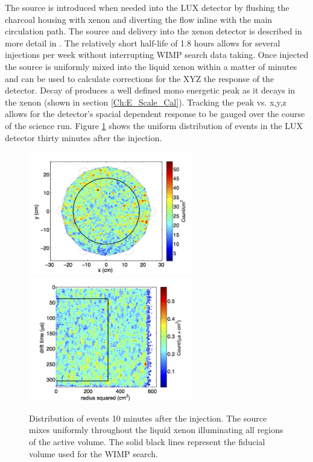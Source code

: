 The \KrCal source is introduced when needed into the LUX detector by flushing the charcoal housing with xenon and diverting the flow inline with the main circulation path. The \KrCal source and delivery into the xenon detector is described in more detail in \cite{Kastens}. The relatively short half-life of 1.8 hours allows for several injections per week without interrupting WIMP search data taking. Once injected the source is uniformly mixed into the liquid xenon within a matter of minutes and can be used to calculate corrections for the XYZ the response of the detector. Decay of \KrCal produces a well defined mono energetic peak as it decays in the xenon (shown in section \ref{Ch:E_Scale_Cal}). Tracking the peak vs. x,y,z allows for the detector's spacial dependent response to be gauged over the course of the science run. Figure \ref{fig:Kr_Dist} shows the uniform distribution of \KrCal events in the LUX detector thirty minutes after the injection. 

\begin{figure}[h!]\centering
\includegraphics[width=72mm]{Chapter_XYZ_Corr/Thesis_Corr_Plots/Kr_XY_density.png}
\includegraphics[width=72mm]{Chapter_XYZ_Corr/Thesis_Corr_Plots/Kr_RZ_density.png}
\caption{Distribution of \KrCal events 10 minutes after the injection. The source mixes uniformly throughout the liquid xenon illuminating all regions of the active volume. The solid black lines represent the fiducial volume used for the WIMP search. }
\label{fig:Kr_Dist}
\end{figure}


